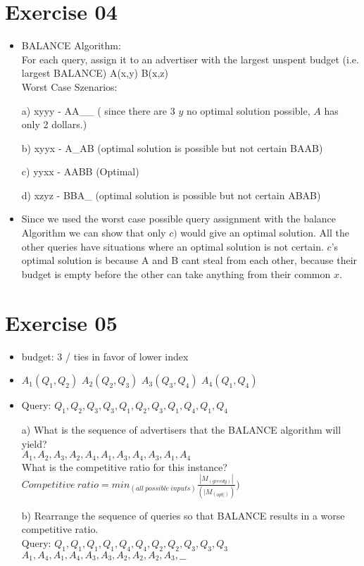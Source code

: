 \documentclass[11pt,a4paper]{scrartcl}
\begin{document}
\section*{Exercise 04}
\begin{itemize}
	\item BALANCE Algorithm:\\
		For each query, assign it to an advertiser with the
		largest unspent budget (i.e. largest BALANCE) A(x,y) B(x,z)\\
		Worst Case Szenarios:

	\item[a)] xyyy - AA\_\_ ( since there are 3 $y$ no optimal solution possible, $A$ has only 2 dollars.)
	
	\item[b)] xyyx - A\_AB (optimal solution is possible but not certain BAAB)
	
	\item[c)] yyxx - AABB (Optimal)
	
	\item[d)] xzyz - BBA\_ (optimal solution is possible but not certain ABAB)
	
	\item Since we used the worst case possible query assignment with the balance Algorithm we can show that only $c)$ 			would give an optimal solution. All the other queries have situations where an optimal solution is not certain.
		$c$'s optimal solution is because A and B cant steal from each other, because their budget is empty before the other 		can take anything from their common $x$.
		
\end{itemize} 

\section*{Exercise 05}
\begin{itemize}
	\item budget: 3 / ties in favor of lower index
	\item $A_1(Q_1,Q_2)$ $A_2(Q_2,Q_3)$ $A_3(Q_3,Q_4)$ $A_4(Q_1,Q_4)$
	\item Query: $Q_1, Q_2, Q_3, Q_3, Q_1, Q_2, Q_3, Q_1, Q_4, Q_1, Q_4$

	\item[a)] What is the sequence of advertisers that the BALANCE algorithm will yield? \\
			$A_1,A_2,A_3,A_2,A_4,A_1,A_3,A_4,A_3,A_1,A_4$\\
	What is the competitive ratio for this instance?\\
	$Competitive\ ratio = min_(all\ possible\ inputs)\frac{|M_(greedy)|}{(|M_(opt|))})$
	
	
	
	\item[b)] Rearrange the sequence of queries so that BALANCE results in a worse competitive ratio.\\
		Query: $Q_1, Q_1, Q_1, Q_1, Q_4, Q_4, Q_2, Q_2, Q_3, Q_3, Q_3$\\
		$A_1,A_4,A_1,A_4,A_3,A_3,A_2,A_2,A_2,A_3, \_\_$
\end{itemize} 	
	
\end{document}
